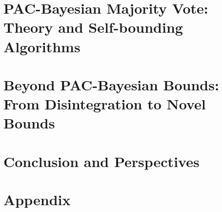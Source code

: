 \documentclass{thesis}
\begin{document}
%
%


\part[PAC-Bayesian Majority Vote:\\ Theory and Self-bounding Algorithms]{PAC-Bayesian Majority Vote:\\ {\LARGE Theory and Self-bounding Algorithms}}
\label{part:contrib-pac-bayes}

%
%
%


\part[Beyond PAC-Bayesian Bounds:\\ From Disintegration to Novel Bounds]{Beyond PAC-Bayesian Bounds:\\ {\LARGE From Disintegration to Novel Bounds}
}
\label{part:contrib-disintegrated}

%
%


\part{Conclusion and Perspectives}
\label{part:conclusion}

%


\appendix
\part{Appendix}



%
%
%
%
%
%

\newrefcontext[sorting=nyt]
\printbibliography[filter={references}, title={References}]


\newpage
\pagestyle{empty}
\strictpagecheck
\checkoddpage
\ifoddpage
~\newpage
\fi

\end{document}
